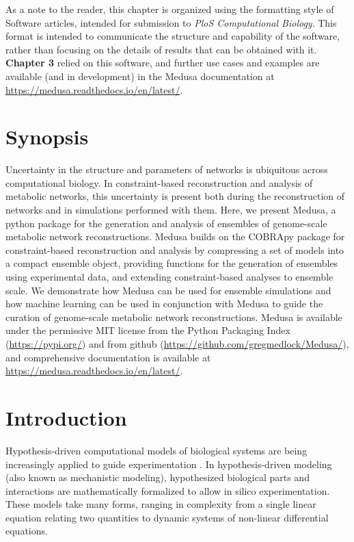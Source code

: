 \documentclass[11pt,twocolumn,notitlepage,openany,twoside]{book}
\begin{document}
\begin{refsection}
As a note to the reader, this chapter is organized using the formatting style of Software articles, intended for submission to \textit{PloS Computational Biology}. This format is intended to communicate the structure and capability of the software, rather than focusing on the details of results that can be obtained with it. \textbf{Chapter 3} relied on this software, and further use cases and examples are available (and in development) in the Medusa documentation at \url{https://medusa.readthedocs.io/en/latest/}.

\section{Synopsis}

Uncertainty in the structure and parameters of networks is ubiquitous across computational biology. In constraint-based reconstruction and analysis of metabolic networks, this uncertainty is present both during the reconstruction of networks and in simulations performed with them. Here, we present Medusa, a python package for the generation and analysis of ensembles of genome-scale metabolic network reconstructions. Medusa builds on the COBRApy package for constraint-based reconstruction and analysis by compressing a set of models into a compact ensemble object, providing functions for the generation of ensembles using experimental data, and extending constraint-based analyses to ensemble scale. We demonstrate how Medusa can be used for ensemble simulations and how machine learning can be used in conjunction with Medusa to guide the curation of genome-scale metabolic network reconstructions. Medusa is available under the permissive MIT license from the Python Packaging Index (\url{https://pypi.org/}) and from github (\url{https://github.com/gregmedlock/Medusa/}), and comprehensive documentation is available at \url{https://medusa.readthedocs.io/en/latest/}.

\section{Introduction}

Hypothesis-driven computational models of biological systems are being increasingly applied to guide experimentation \cite{Kitano2002-az}. In hypothesis-driven modeling (also known as mechanistic modeling), hypothesized biological parts and interactions are mathematically formalized to allow in silico experimentation. These models take many forms, ranging in complexity from a single linear equation relating two quantities to dynamic systems of non-linear differential equations.


\end{refsection}
\end{document}
